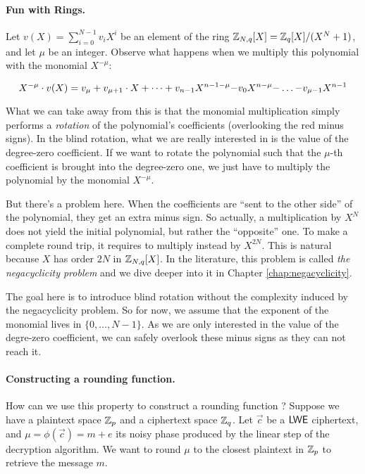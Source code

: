\paragraph{Fun with Rings.}

Let $v(X) = \displaystyle \sum_{i=0}^{N-1} v_i X^i$ be an element of the ring $\mathbb{Z}_{N,q}[X] = \mathbb{Z}_q[X] / (X^N + 1)$, and let $\mu$ be an integer. Observe what happens when we multiply this polynomial with the monomial $X^{-\mu}$:

\begin{equation*}
	X^{-\mu} \cdot v(X) = v_\mu + v_{\mu + 1} \cdot X + \dots + v_{n-1} X^{n-1-\mu} \textcolor{red}{-} v_0 X^{n - \mu} \textcolor{red}{-} \dots \textcolor{red}{-} v_{\mu - 1} X^{n-1}
\end{equation*}

What we can take away from this is that the monomial multiplication simply performs a \textit{rotation} of the polynomial's coefficients (overlooking the red minus signs). In the blind rotation, what we are really interested in is the value of the degree-zero coefficient. If we want to rotate the polynomial such that the $\mu$-th coefficient is brought into the degree-zero one, we just have to multiply the polynomial by the monomial $X^{-\mu}$.

But there's a problem here. When the coefficients are ``sent to the other side'' of the polynomial, they get an extra minus sign. So actually, a multiplication by $X^N$ does not yield the initial polynomial, but rather the ``opposite'' one. To make a complete round trip, it requires to multiply instead by $X^{2N}$. This is natural because $X$ has order $2N$ in $\mathbb{Z}_{N,q}[X]$. In the literature, this problem is called \textit{the negacyclicity problem} and we dive deeper into it in Chapter \ref{chap:negacyclicity}.

The goal here is to introduce blind rotation without the complexity induced by the negacyclicity problem. So for now, we assume that the exponent of the monomial lives in $\lbrace 0, \dots, N-1 \rbrace$. As we are only interested in the value of the degre-zero coefficient, we can safely overlook these minus signs as they can not reach it.

\paragraph{Constructing a rounding function.}
How can we use this property to construct a rounding function ? Suppose we have a plaintext space $\mathbb{Z}_p$ and a ciphertext space $\mathbb{Z}_q$. Let $\vec c$ be  a $\textsf{LWE}$ ciphertext, and $\mu = \phi(\vec c) = m + e$ its noisy phase produced by the linear step of the decryption algorithm. We want to round $\mu$ to the closest plaintext in $\mathbb{Z}_p$ to retrieve the message $m$.

